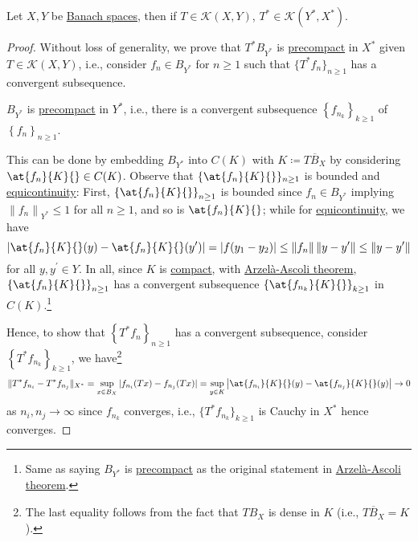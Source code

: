 \begin{theorem}\label{thm:Schauder}
	Let \(X, Y\) be \hyperref[def:Banach-space]{Banach spaces}, then if \(T\in \mathcal{K}(X, Y)\), \(T^{\ast} \in \mathcal{K}(Y^{\ast} , X^{\ast} )\).
\end{theorem}
\begin{proof}
	Without loss of generality, we prove that \(T^{\ast} B_{Y^{\ast} }\) is \hyperref[def:precompact]{precompact} in \(X^{\ast}\) given \(T\in \mathcal{K}(X, Y)\), i.e., consider \(f_n \in B_{Y^{\ast} }\) for \(n \geq 1\) such that \(\{T^{\ast} f_n\}_{n\geq 1}\) has a convergent subsequence.

	\begin{claim}
		\(B_{Y^{\ast} }\) is \hyperref[def:precompact]{precompact} in \(Y^{\ast} \), i.e., there is a convergent subsequence \(\left\{ f_{n_k} \right\} _{k\geq 1}\) of \(\left\{ f_n \right\} _{n\geq 1}\).
	\end{claim}
	\begin{explanation}
		This can be done by embedding \(B_{Y^{\ast} }\) into \(C(K)\) with \(K\coloneqq \overline{TB_X}\) by considering \(\at{f_n}{K}{} \in C(K)\). Observe that \(\{\at{f_n}{K}{}\}_{n\geq 1}\) is bounded and \hyperref[def:equicontinuous]{equicontinuity}: First, \(\left\{ \at{f_n}{K}{}  \right\} _{n\geq 1}\) is bounded since \(f_{n} \in B_{Y^{\ast} }\) implying \(\left\lVert f_n \right\rVert _{Y^{\ast} } \leq 1\) for all \(n\geq 1\), and so is \(\at{f_n}{K}{} \); while for \hyperref[def:equicontinuous]{equicontinuity}, we have
		\[
			\left\vert \at{f_{n}}{K}{} (y) - \at{f_{n}}{K}{} (y^\prime ) \right\vert
			= \vert f(y_1 - y_2) \vert
			\leq \left\lVert f_{n} \right\rVert \left\lVert y-y^\prime \right\rVert
			\leq \left\lVert y - y^\prime \right\rVert
		\]
		for all \(y, y^\prime \in Y\). In all, since \(K\) is \hyperref[def:compact]{compact}, with \hyperref[thm:Arzela-Ascoli]{Arzelà-Ascoli theorem}, \(\left\{ \at{f_n}{K}{} \right\}_{n\geq 1} \) has a convergent subsequence \(\left\{ \at{f_{n_k}}{K}{}\right\}_{k\geq 1} \) in \(C(K)\).\footnote{Same as saying \(B_{Y^{\ast} }\) is \hyperref[def:precompact]{precompact} as the original statement in \hyperref[thm:Arzela-Ascoli]{Arzelà-Ascoli theorem}.}
	\end{explanation}

	Hence, to show that \(\left\{ T^{\ast} f_n \right\}_{n\geq 1} \) has a convergent subsequence, consider \(\left\{ T^{\ast} f_{n_k} \right\}_{k\geq 1} \), we have\footnote{The last equality follows from the fact that \(TB_X\) is dense in \(K\) (i.e., \(\overline{TB_X} = K\)).}
	\[
		\lVert T^{\ast} f_{n_i} - T^{\ast} f_{n_j} \rVert_{X^{\ast} }
		= \sup _{x\in B_X} \vert f_{n_i}(Tx) - f_{n_j}(Tx)\vert
		= \sup _{y\in K} \left\vert \at{f_{n_i}}{K}{} (y) - \at{f_{n_j}}{K}{} (y) \right\vert \to 0
	\]
	as \(n_i, n_j \to \infty \) since \(f_{n_k}\) converges, i.e., \(\{T^{\ast} f_{n_{k} }\}_{k\geq 1}\) is Cauchy in \(X^{\ast} \) hence converges.
\end{proof}